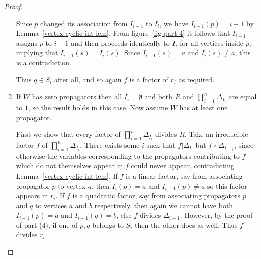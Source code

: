 \documentclass[11pt]{article}
\newcommand{\note}{\todo[color=green!40]}
\theoremstyle{remark}
\theoremstyle{definition}
\begin{document}
\begin{proof}
\begin{enumerate}
Since $p$ changed its association from $I_{i-1}$ to $I_i$, we have $I_{i-1}(p) = i-1$ by Lemma~\ref{vertex cyclic int lem}. From figure~\ref{fig part 4} it follows that $I_{i-1}$ assigns $p$ to $i-1$ and then proceeds identically to $I_i$ for all vertices inside $p$, implying that $I_{i-1}(s) = I_i(s)$. Since $I_{i-1}(s) = a$ and $I_i(s) \neq a$, this is a contradiction. 

Thus $q\in S_i$ after all, and so again $f$ is a factor of $r_i$ as required.

  



\item If $W$ has zero propagators then all $I_i=\emptyset$ and both $R$ and $\prod_{i=1}^n \Delta_{I_i}$ are equal to $1$, so the result holds in this case.  Now assume $W$ has at least one propagator.

First we show that every factor of $\prod_{i=1}^n \Delta_{I_i}$ divides $R$.  Take an irreducible factor $f$ of $\prod_{i=1}^n \Delta_{I_i}$. There exists some $i$ such that $f|\Delta_{I_i}$ but $f\!\!\nmid\!\! \Delta_{I_{i-1}}$, since otherwise the variables corresponding to the propagators contributing to $f$ which do not themselves appear in $f$ could never appear, contradicting Lemma~\ref{vertex cyclic int lem}.  If $f$ is a linear factor, say from associating propagator $p$ to vertex $a$, then $I_{i}(p)=a$ and $I_{i-1}(p)\neq a$ so this factor appears in $r_i$.  If $f$ is a quadratic factor, say from associating propagators $p$ and $q$ to vertices $a$ and $b$ respectively, then again we cannot have both $I_{i-1}(p) = a$ and $I_{i-1}(q) = b$, else $f$ divides $\Delta_{i-1}$. However, by the proof of part (4), if one of $p,q$ belongs to $S_i$ then the other does as well.  Thus $f$ divides $r_i$.


\end{enumerate}
\end{proof}
\end{document}

